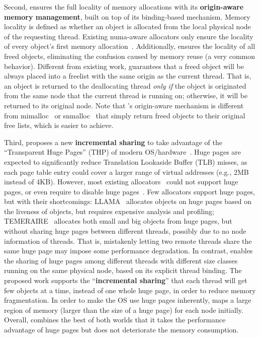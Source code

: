 Second, \NM{} ensures the full locality of memory allocations with its \textbf{origin-aware memory management},  built on top of its binding-based mechanism. Memory locality is defined as
whether an object is allocated from the local physical node of the requesting thread. Existing numa-aware allocators only ensure the locality of every object’s first memory allocation~\cite{tcmalloc, mimalloc, yang2019jarena}. Additionally, \NM{} ensures the locality of all freed objects, eliminating the confusion caused by memory reuse (a very common behavior). Different from existing work, \NM{} guarantees that a freed object will be always placed into a freelist with the same origin as the current thread. That is, an object is returned to the deallocating thread \textit{only if} the object is originated from the same node that the current thread is running on; otherwise, it will be returned to its original node. 
Note that \NM{}'s origin-aware mechanism is different from mimalloc~\cite{mimalloc} or snmalloc~\cite{Snmalloc} that simply return freed objects to their original free lists, which is easier to achieve. 

Third, \NM{} proposes a new \textbf{incremental sharing} to take advantage of the ``Transparent Huge Pages'' (THP) of modern OS/hardware~\cite{hugepage}. Huge pages are expected to significantly reduce Translation Lookaside Buffer (TLB) misses, as each page table entry could cover a larger range of virtual addresses (e.g., 2MB instead of 4KB). However, most existing allocators~\cite{dlmalloc, Hoard, Scalloc} could not support huge pages, or even require to disable huge pages~\cite{scallochugepage}. Few allocators support huge pages, but with their shortcomings: LLAMA~\cite{LLAMA} allocates objects on huge pages based on the liveness of objects, but requires expensive analysis and profiling;  TEMERAIRE~\cite{TEMERAIRE} allocates both small and big objects from huge pages, but without sharing huge pages between different threads, possibly due to no node information of threads. That is,  mistakenly letting two remote threads share the same huge page may impose some performance degradation.  
In contrast, \NM{} enables the sharing of huge pages among different threads with different size classes running on the same physical node, based on its explicit thread binding. 
The proposed work supports the ``\textbf{incremental sharing}'' that each thread will get few objects at a time, instead of one whole huge page, in order to reduce memory fragmentation. 
In order to make the OS use huge pages inherently, \NM{} maps a large region of memory (larger than the size of a huge page) for each node initially. Overall, \NM{} combines the best of both worlds that it takes the performance advantage of huge pages but does not deteriorate the memory consumption. 

